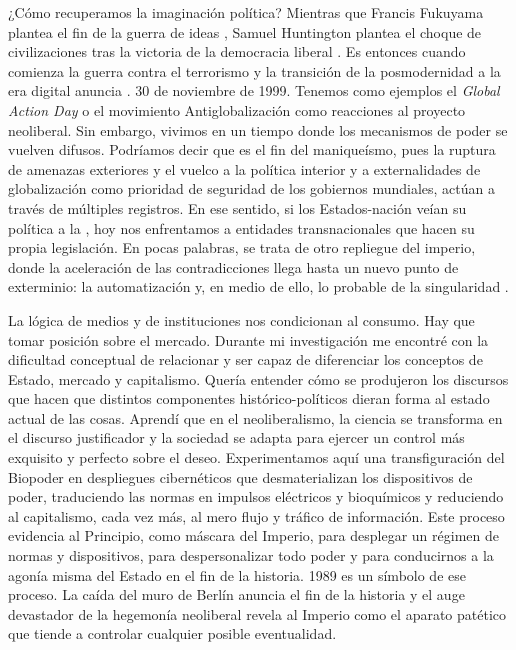¿Cómo recuperamos la imaginación política? Mientras que Francis Fukuyama plantea el fin de la guerra de ideas \autocite{fukuyamaFinHistoriaUltimo1992}, Samuel Huntington plantea el choque de civilizaciones tras la victoria de la democracia liberal \autocite{huntingtonClashCivilizationsRemaking1996}. Es entonces cuando comienza la guerra contra el terrorismo y la transición de la posmodernidad a la era digital anuncia . 30 de noviembre de 1999. Tenemos como ejemplos el \emph{Global Action Day} o el movimiento Antiglobalización como reacciones al proyecto neoliberal. Sin embargo, vivimos en un tiempo donde los mecanismos de poder se vuelven difusos. Podríamos decir que es el fin del maniqueísmo, pues la ruptura de amenazas exteriores y el vuelco a la política interior y a externalidades de globalización como prioridad de seguridad de los gobiernos mundiales, actúan a través de múltiples registros. En ese sentido, si los Estados-nación veían su política a la , hoy nos enfrentamos a entidades transnacionales que hacen su propia legislación. En pocas palabras, se trata de otro repliegue del imperio, donde la aceleración de las contradicciones llega hasta un nuevo punto de exterminio: la automatización y, en medio de ello, lo probable de la singularidad \autocite{fraseFourFutures2011,fraseFourFuturesVisions2016}.

La lógica de medios y de instituciones nos condicionan al consumo. Hay que tomar posición sobre el mercado. Durante mi investigación me encontré con la dificultad conceptual de relacionar y ser capaz de diferenciar los conceptos de Estado, mercado y capitalismo. Quería entender cómo se produjeron los discursos que hacen que distintos componentes histórico-políticos dieran forma al estado actual de las cosas. Aprendí que en el neoliberalismo, la ciencia se transforma en el discurso justificador y la sociedad se adapta para ejercer un control más exquisito y perfecto sobre el deseo. Experimentamos aquí una transfiguración del Biopoder en despliegues cibernéticos que desmaterializan los dispositivos de poder, traduciendo las normas en impulsos eléctricos y bioquímicos y reduciendo al capitalismo, cada vez más, al mero flujo y tráfico de información. Este proceso evidencia al Principio, como máscara del Imperio, para desplegar un régimen de normas y dispositivos, para despersonalizar todo poder y para conducirnos a la agonía misma del Estado en el fin de la historia. 1989 es un símbolo de ese proceso. La caída del muro de Berlín anuncia el fin de la historia y el auge devastador de la hegemonía neoliberal revela al Imperio como el aparato patético que tiende a controlar cualquier posible eventualidad.

